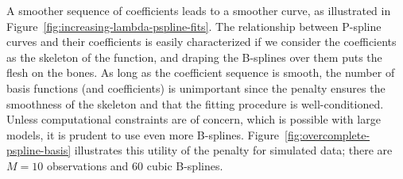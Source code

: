 A smoother sequence of coefficients leads to a smoother curve, as illustrated in Figure~\ref{fig:increasing-lambda-pspline-fits}.  The relationship between P-spline curves and their coefficients is easily characterized if we consider the coefficients as the skeleton of the function, and draping the B-splines over them puts the flesh on the bones. As long as the coefficient sequence is smooth, the number of basis functions (and coefficients) is unimportant since the penalty ensures the smoothness of the skeleton and that the fitting procedure is well-conditioned.  Unless computational constraints are of concern, which is possible with large models, it is prudent to use even more B-splines.  Figure~\ref{fig:overcomplete-pspline-basis} illustrates this utility of the penalty for simulated data; there are $M=10$ observations and $60$ cubic B-splines. 

